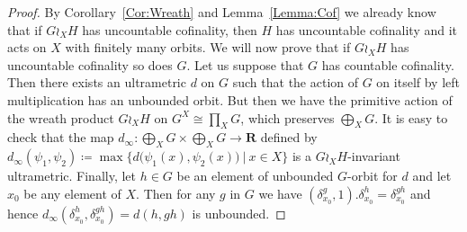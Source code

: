 \documentclass[a4paper]{article}
\theoremstyle{definition}
\theoremstyle{remark}%
\newcommand{\setst}[2]{\{#1\ |\ #2\}}
\begin{document}
\begin{proof}
By Corollary~\ref{Cor:Wreath} and Lemma~\ref{Lemma:Cof} we already know that if $G \wr_X H$ has uncountable cofinality, then $H$ has uncountable cofinality and it acts on $X$ with finitely many orbits.
We will now prove that if $G \wr_X H$ has uncountable cofinality so does $G$.
Let us suppose that $G$ has countable cofinality. Then there exists an ultrametric $d$ on $G$ such that the action of $G$ on itself by left multiplication has an unbounded orbit.
But then we have the primitive action of the wreath product $G\wr_XH$ on $G^X\cong\prod_XG$,
which preserves $\bigoplus_XG$.
It is easy to check that the map $d_\infty\colon\bigoplus_XG\times\bigoplus_XG\to\mathbf R$ defined by $d_\infty(\psi_1,\psi_2)\coloneqq\max\setst{d\bigl(\psi_1(x),\psi_2(x)\bigr)}{x\in X}$ is a $G\wr_XH$-invariant ultrametric.
Finally, let $h\in G$ be an element of unbounded $G$-orbit for $d$ and let $x_0$ be any element of $X$.
Then for any $g$ in $G$ we have $(\delta_{x_0}^g,1).\delta_{x_0}^h=\delta_{x_0}^{gh}$ and hence $d_\infty(\delta_{x_0}^h,\delta_{x_0}^{gh})=d(h,gh)$ is unbounded.


\end{proof}
\end{document}
